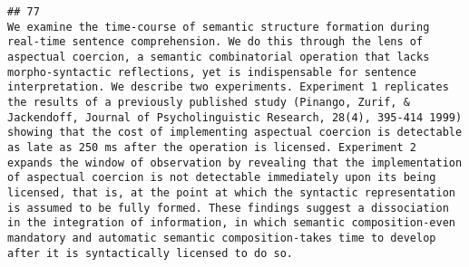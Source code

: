 \documentclass[
  english,
  man]{apa6}
\begin{document}
\begin{verbatim}
## 77                                                                                                                                                                                                                                                                                                                                                                                                                                                                                                                                                                                                                                                                                                                                                                                                                                                                                                                                                                                                                                                                                                                                                                                                                                                                                                                                                                                                                                                                                                                                                                         We examine the time-course of semantic structure formation during real-time sentence comprehension. We do this through the lens of aspectual coercion, a semantic combinatorial operation that lacks morpho-syntactic reflections, yet is indispensable for sentence interpretation. We describe two experiments. Experiment 1 replicates the results of a previously published study (Pinango, Zurif, & Jackendoff, Journal of Psycholinguistic Research, 28(4), 395-414 1999) showing that the cost of implementing aspectual coercion is detectable as late as 250 ms after the operation is licensed. Experiment 2 expands the window of observation by revealing that the implementation of aspectual coercion is not detectable immediately upon its being licensed, that is, at the point at which the syntactic representation is assumed to be fully formed. These findings suggest a dissociation in the integration of information, in which semantic composition-even mandatory and automatic semantic composition-takes time to develop after it is syntactically licensed to do so.

\end{verbatim}
\end{document}
